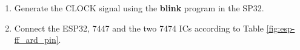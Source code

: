 \begin{enumerate}
\item Generate the CLOCK signal using the \textbf{blink} program in the SP32.
\item Connect the ESP32, 7447 and the two 7474 ICs according to Table \ref{fig:esp-ff_ard_pin}.
\begin{table}[H]
\centering

\caption{}
\label{fig:esp-ff_ard_pin}
\end{table}
%
%
\iffalse
\item
The code for Decade counter is given in the below link
\begin{lstlisting}
https://github.com/pradyumnasv9/esp32/blob/psv/ide/7447/codes/ip_inc_dec.ino
\end{lstlisting}
\fi
\end{enumerate}


